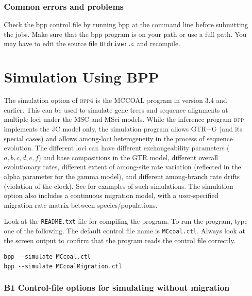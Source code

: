 \documentclass[a4paper]{book}
\numberwithin{equation}{section} \renewcommand{\baselinestretch}{0.55}
\begin{document}
\subsection{Common errors and problems}

Check the bpp control file by running bpp at the command line before
submitting the jobs.  Make sure that the bpp program is on your path
or use a full path.  You may have to edit the source file
\texttt{BFdriver.c} and recompile.


\chapter{Simulation Using BPP}

The simulation option of \textsc{bpp4} is the MCCOAL program in
version 3.4 and earlier.  This can be used to simulate gene trees and
sequence alignments at multiple loci under the MSC \citep{Rannala2003}
and MSci \citep{Flouri2020a} models.  While the inference program
\textsc{bpp} implements the JC model only, the simulation program
allows GTR+G (and its special cases) and allows among-loci
heterogeneity in the process of sequence evolution.  The different
loci can have different exchangeability parameters
($a, b, c, d, e, f$) and base compositions in the GTR model, different
overall evolutionary rates, different extent of among-site rate
variation (reflected in the alpha parameter for the gamma model), and
different among-branch rate drifts (violation of the clock).  See
\citet{Shi2018} for examples of such simulations.  The simulation
option also includes a continuous migration model, with a
user-specified migration rate matrix between species/populations.

Look at the \texttt{README.txt} file for compiling the program.  To
run the program, type one of the following.  The default control file
name is \texttt{MCcoal.ctl}.  Always look at the screen output to
confirm that the program reads the control file correctly.
\begin{verbatim}
bpp --simulate MCcoal.ctl
bpp --simulate MCcoalMigration.ctl
\end{verbatim}


\subsection{B1 Control-file options for simulating without migration}
\end{document}
